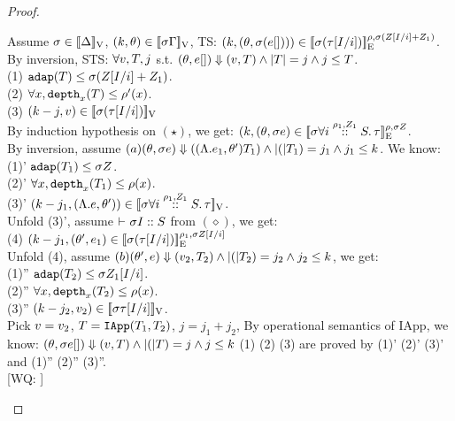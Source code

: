 \documentclass[a4paper,11pt]{article}
\newcommand{\wq}[1]{\textcolor[rgb]{.50,0.0,0.7}{[WQ: #1]}}
\theoremstyle{definition}
\begin{document}
\begin{proof}
\begin{mainitem}
Assume $\ienv \in \lrv{\Delta}$, $(\stepiA, \env) \in \lrv{\ienv \Gamma}$, TS: $(\stepiA, (\env, \ienv (\expr []))) \in \lre{\dmap}{\ienv(\nnatA[I/i] + \nnatA_1)}{\ienv(\type[I/i])}$.\\
%
By inversion, STS: $\forall \valr, \tr, j$ s.t. $(\env, \expr []) \bigstep (\valr, \tr) \land \size{\tr} = j \land j \leq \tr $.\\
(1) $ \adap(\tr) \leq \ienv (\nnatA[I/i] + \nnatA_1)$.\\
(2) $ \forall x, \ddep{x}(\tr) \leq \dmap'(x) $.\\
(3) $ (\stepiA - j, \valr) \in \lrv{\ienv(\type[I/i])}$\\
By induction hypothesis on $(\star)$, we get: $(k, (\env, \ienv \expr) \in \lre{\dmap}{\ienv \nnatA}{\ienv \tforall{\dmap_1}{\nnatA_1}{i} \type}$.\\
%
By inversion, assume $(a) (\env, \ienv \expr) \bigstep ((\eilam \expr_1, \env') \tr_1) \land \size(\tr_1) = j_1 \land j_1 \leq \stepiA$. We know:\\
(1)' $\adap(\tr_1) \leq \ienv \nnatA$.\\
(2)' $\forall x, \ddep{x}(\tr_1) \leq \dmap(x)$.\\
(3)' $(\stepiA - j_1, (\eilam \expr, \env')) \in \lrv{\ienv \tforall{\dmap_1}{\nnatA_1}{i} \type} $.\\
Unfold (3)', assume $\tvdash{} \ienv I ::S$ from $(\diamond)$, we get:\\
(4) $(k - j_1, (\env', \expr_1) \in \lre{\dmap_1}{\ienv \nnatA[I/i]}{\ienv (\type[I/i])}$\\
%
Unfold (4), assume $(b) (\env', \expr ) \bigstep (\valr_2, \tr_2) \land \size(\tr_2) = j_2 \land j_2 \leq \stepiA$,  we get:\\
(1)'' $\adap(\tr_2) \leq \ienv \nnatA_1[I/i]$.\\
(2)'' $\forall x, \ddep{x}(\tr_2) \leq \dmap(x)$.\\
(3)'' $(\stepiA - j_2, \valr_2) \in \lrv{\ienv \type[I/i]}$.\\
Pick $\valr = \valr_2$, $\tr = \triapp{\tr_1}{\tr_2}$, $j = j_1 + j_2$,
By operational semantics of IApp, we know:
$(\env, \ienv \expr []) \bigstep (\valr, \tr) \land \size(\tr) = j \land j \leq \stepiA$
(1) (2) (3) are proved by (1)' (2)' (3)' and (1)'' (2)'' (3)''.\\


\wq{ \caseL{
$
  \boxed{
    \inferrule*[right = PRIMITIVE]{
      \Delta; \Gamma; \dmap \tvdash{\nnatA} \expr:  \tbox{  (\tarr{ \tau_1
        }{ \tau_2 }{0}{\dmap''}{0})     } ~(\star)   \\
      \nnatA' = 1 + \nnatA \\
      \dmap' = 1 + \max( \dmap, \dmap''+ \nnatA)
    }{
      \Delta; \Gamma; \dmap' \tvdash{\nnatA'} \eop(\expr): \treal
    }
    }
$
} }


\end{mainitem}
\end{proof}
\end{document}
